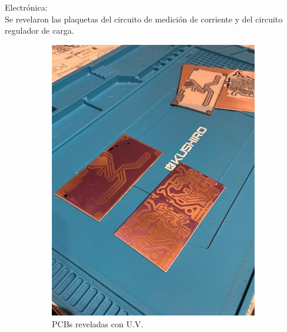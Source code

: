 Electrónica:\\

Se revelaron las plaquetas del circuito de medición de corriente y del circuito regulador de carga.\\

\begin{figure}[H]

\begin{subfigure}{0.5\textwidth}
\includegraphics[width=0.9\linewidth]{informes/IMG_8026.jpg} 
\caption{PCBs reveladas con U.V.}
\end{subfigure}
\begin{subfigure}{0.5\textwidth}

\end{subfigure}
\end{figure}
